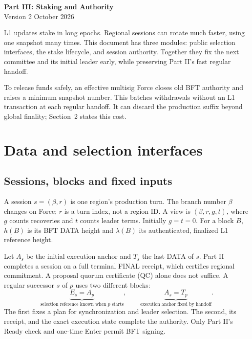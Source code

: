 \documentclass[11pt,a4paper]{article}
\begin{document}
\begin{center}
{\Large\bfseries Part III: Staking and Authority}\\[3pt]
{\small Version 2  October 2026}
\end{center}

L1 updates stake in long epochs. Regional sessions can rotate much faster,
using one snapshot many times. This document has three modules: public
selection interfaces, the stake lifecycle, and session authority. Together
they fix the next committee and its initial leader early, while preserving
Part II's fast regular handoff.

To release funds safely, an effective multisig Force closes old BFT
authority and raises a minimum snapshot number. This batches withdrawals
without an L1 transaction at each regular handoff. It can discard the
production suffix beyond global finality; Section~2 states this cost.

\section{Data and selection interfaces}
\label{sec:data}
\subsection{Sessions, blocks and fixed inputs}
A session $s=(\beta,r)$ is one region's production turn. The branch number
$\beta$ changes on Force; $r$ is a turn index, not a region ID. A view is
$(\beta,r,g,t)$, where $g$ counts recoveries and $t$ counts leader terms.
Initially $g=t=0$. For a block $B$, $h(B)$ is its BFT DATA height and
$\lambda(B)$ its authenticated, finalized L1 reference height.

Let $A_s$ be the initial execution anchor and $T_s$ the last DATA of $s$.
Part II completes a session on a full terminal FINAL receipt, which
certifies regional commitment. A proposal quorum certificate (QC) alone
does not suffice. A regular successor $s$ of $p$ uses two different blocks:
\[
 \underbrace{E_s=A_p}_{\text{selection reference known when }p\text{ starts}},
 \qquad
 \underbrace{A_s=T_p}_{\text{execution anchor fixed by handoff}}.
\]
The first fixes a plan for synchronization and leader selection. The
second, its receipt, and the exact execution state complete the authority.
Only Part II's Ready check and one-time Enter permit BFT signing.
\end{document}
